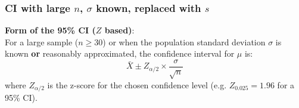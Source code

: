 \documentclass[9pt]{extarticle}
\begin{document}
\subsubsection{CI with large $n$, $\sigma$ known, replaced with $s$}
\textbf{Form of the 95\% CI ($Z$ based)}: \\
For a large sample ($n \geq 30$) or when the population standard deviation $\sigma$ is known \textbf{or} reasonably approximated, the confidence interval for $\mu$ is:
$$\bar{X} \pm Z_{\alpha/2} \times \frac{\sigma}{\sqrt{n}}$$
where $Z_{\alpha/2}$ is the z-score for the chosen confidence level (e.g. $Z_{0.025} = 1.96$ for a 95\% CI).
\end{document}
